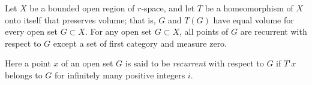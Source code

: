 Let $X$ be a bounded open region of $r$-space, and let $T$ be a homeomorphism of $X$ onto itself that preserves volume; that is, $G$ and $T(G)$ have equal volume for every open set $G \subset X$. For any open set $G \subset X$, all points of $G$ are recurrent with respect to $G$ except a set of first category and measure zero.

Here a point $x$ of an open set $G$ is said to be \textit{recurrent} with respect to $G$ if $T^i x$ belongs to $G$ for infinitely many positive integers $i$.
